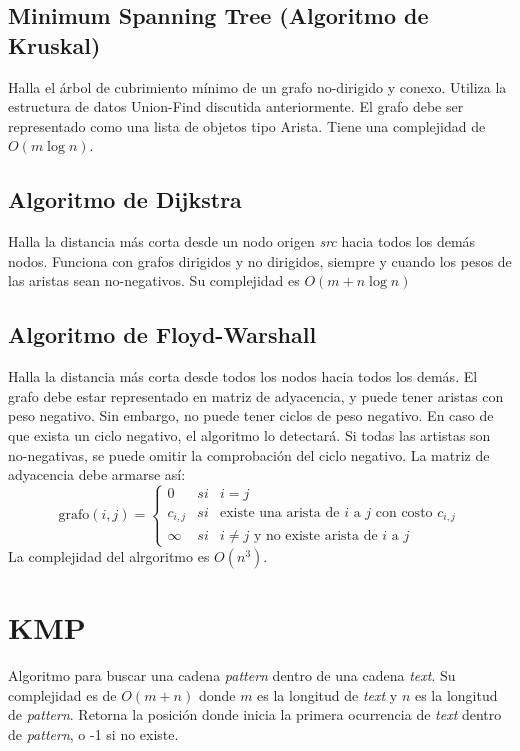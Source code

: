 \documentclass{article}
\begin{document}
\begin{multicols}{2}
	\subsection{Minimum Spanning Tree (Algoritmo de Kruskal)}
	Halla el árbol de cubrimiento mínimo de un grafo no-dirigido y conexo. Utiliza la estructura de datos Union-Find discutida anteriormente. El grafo debe ser representado como una lista de objetos tipo Arista. Tiene una complejidad de \( O( m \log n) \).
	
	
	\subsection{Algoritmo de Dijkstra}
	Halla la distancia más corta desde un nodo origen \emph{src} hacia todos los demás nodos. Funciona con grafos dirigidos y no dirigidos, siempre y cuando los pesos de las aristas sean no-negativos. Su complejidad es \( O(m + n \log n) \)
	
	
	\subsection{Algoritmo de Floyd-Warshall}
	Halla la distancia más corta desde todos los nodos hacia todos los demás. El grafo debe estar representado en matriz de adyacencia, y puede tener aristas con peso negativo. Sin embargo, no puede tener ciclos de peso negativo. En caso de que exista un ciclo negativo, el algoritmo lo detectará. Si todas las artistas son no-negativas, se puede omitir la comprobación del ciclo negativo.
	La matriz de adyacencia debe armarse así:
	\[
		\text{grafo}(i, j) = \left \{ 
			\begin{array}{lcc}
				0 & si & i = j
				\\ c_{i,j} & si & \text{existe una arista de } i \text{ a } j \text{ con costo } c_{i,j}
				\\ \infty & si & i \neq j \text{ y no existe arista de } i \text{ a } j 
			\end{array}
		\right.
	\]
	La complejidad del alrgoritmo es \( O(n^3) \).
	

\section{KMP}
Algoritmo para buscar una cadena \emph{pattern} dentro de una cadena \emph{text}. Su complejidad es de \( O(m+n) \) donde \( m \) es la longitud de \emph{text} y \( n \) es la longitud de \emph{pattern}. Retorna la posición donde inicia la primera ocurrencia de \emph{text} dentro de \emph{pattern}, o -1 si no existe.



\end{multicols}
\end{document}
